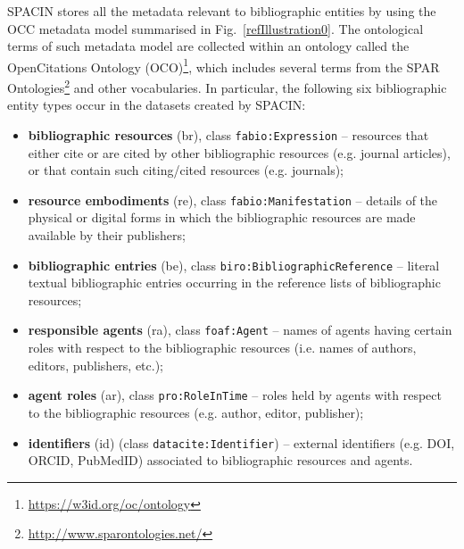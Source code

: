 \documentclass[runningheads,a4paper]{llncs}
\begin{document}
SPACIN stores all the metadata relevant to bibliographic entities by using the OCC metadata model  \cite{__RefNumPara__14748_1591320820} summarised in Fig.~\ref{refIllustration0}. The ontological terms of such metadata model are collected within an ontology called the OpenCitations Ontology (OCO)\footnote{\url{https://w3id.org/oc/ontology}}, which includes several terms from the SPAR Ontologies\footnote{\url{http://www.sparontologies.net/}} \cite{__RefNumPara__17_1852566440} and other vocabularies. In particular, the following six bibliographic entity types occur in the datasets created by SPACIN:
\begin{itemize}
\item {\bf bibliographic resources} (br), class \Verb+fabio:Expression+ -- resources that either cite or are cited by other bibliographic resources (e.g. journal articles), or that contain such citing/cited resources (e.g. journals);
\item {\bf resource embodiments} (re), class \Verb+fabio:Manifestation+ -- details of the physical or digital forms in which the bibliographic resources are made available by their publishers;
\item {\bf bibliographic entries} (be), class \Verb+biro:BibliographicReference+ -- literal textual bibliographic entries occurring in the reference lists of bibliographic resources;
\item {\bf responsible agents} (ra), class \Verb+foaf:Agent+ -- names of agents having certain roles with respect to the bibliographic resources (i.e. names of authors, editors, publishers, etc.);
\item {\bf agent roles} (ar), class \Verb+pro:RoleInTime+ -- roles held by agents with respect to the bibliographic resources (e.g. author, editor, publisher);
\item {\bf identifiers} (id) (class \Verb+datacite:Identifier+) -- external identifiers (e.g. DOI, ORCID, PubMedID) associated to bibliographic resources and agents.
\end{itemize}
\end{document}
